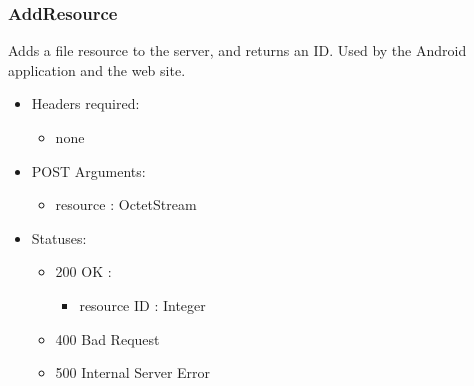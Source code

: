     \subsubsection{AddResource}
        Adds a file resource to the server, and returns an ID. Used by the Android application and the web site.
        \begin{itemize}
            \item Headers required: 
            \begin{itemize}
                \item none
            \end{itemize}
            \item POST Arguments:
            \begin{itemize}
                \item resource : OctetStream
            \end{itemize}
            \item Statuses:
            \begin{itemize}
                \item 200 OK :
                \begin{itemize}
                    \item resource ID : Integer
                \end{itemize}
                \item 400 Bad Request
                \item 500 Internal Server Error
            \end{itemize}
        \end{itemize}

